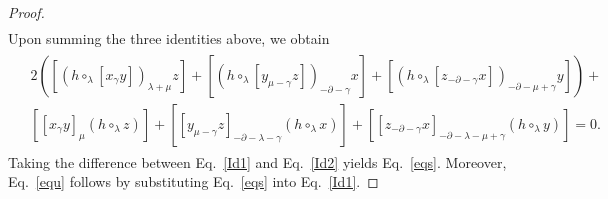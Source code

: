 \documentclass[10pt,a4paper]{amsart}
\begin{document}
\begin{proof}
\begin{align*}
   \end{align*}
Upon summing the three identities above, we obtain
   \begin{eqnarray}
      \begin{aligned}\label{Id2}
      &2\left([(h\circ_{\lambda}[x_{\gamma}y])_{\lambda+\mu}z]+[(h\circ_{\lambda}[y_{\mu-\gamma}z])_{-\partial-\gamma}x]+[(h\circ_{\lambda}[z_{-\partial-\gamma}x])_{-\partial-\mu+\gamma}y]\right)+ \\
      &[[x_{\gamma}y]_{\mu}(h\circ_{\lambda}z)]+[[y_{\mu-\gamma}z]_{-\partial-\lambda-\gamma}(h\circ_{\lambda}x)]+[[z_{-\partial-\gamma}x]_{-\partial-\lambda-\mu+\gamma}(h\circ_{\lambda}y)]=0.
      \end{aligned}
   \end{eqnarray}
Taking the difference between Eq.~\eqref{Id1} and Eq.~\eqref{Id2} yields Eq.~\eqref{eqs}.
Moreover, Eq.~\eqref{equ} follows by substituting Eq.~\eqref{eqs} into Eq.~\eqref{Id1}.


\end{proof}
\end{document}
